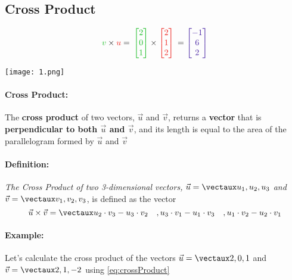 \documentclass{article}
\begin{document}
\color{white}
\subsection{Cross Product}
\color{black}

\begin{minipage}{0.45\textwidth}
\begin{figure}[H]
\begin{equation*}
\color{groen} v \color{black}\times \color{rooj} u \color{black} = \color{groen}\\ \icol{2\\0\\1}\color{black}\times \color{rooj} \icol{2\\ 1 \\ 2} \color{black}\\
= \color{blou} \icol{-1\\6\\2}\color{black}
\end{equation*}
\end{figure}
\end{minipage} \hfill
\begin{minipage}{0.55\textwidth}
\texttt{[image: 1.png]}
\end{minipage}

\paragraph{Cross Product:} The \textbf{cross product} of two vectors, $\vec{u}$ and $\vec{v}$, returns a \textbf{vector} that is \textbf{perpendicular to both $\vec{u}$ and $\vec{v}$}, and its length is equal to the area of the parallelogram formed by $\vec{u}$ and $\vec{v}$

\color{theorem} \paragraph{Definition:} \textit{The Cross Product of two 3-dimensional vectors, $\vec{u} = \vect{u_1, u_2, u_3}$ and $\vec{v}=\vect{v_1,v_2,v_3}$}, is defined as the vector
\begin{equation}\label{eq:crossProduct}
\vec{u}\times\vec{v}= \vect{u_2\cdot v_3-u_3\cdot v_2\quad, u_3\cdot v_1-u_1\cdot v_3\quad, u_1\cdot v_2-u_2\cdot v_1}
\end{equation}
\color{black}  

\paragraph{Example:} Let's calculate the cross product of the vectors \color{groen} $\vec{u}=\vect{2,0,1}$ \color{black}and \color{rooj} $\vec{v}=\vect{2,1,-2}$ \color{black} using \ref{eq:crossProduct}
\end{document}

